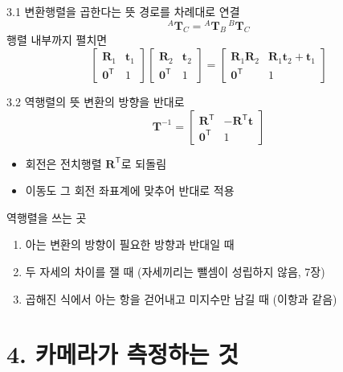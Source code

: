 \documentclass[aspectratio=169,11pt]{beamer}
\begin{document}
\begin{frame}{3.1 변환행렬을 곱한다는 뜻}
  경로를 차례대로 연결
  \[
    {}^{A}\mathbf{T}_{C}
    =
    {}^{A}\mathbf{T}_{B}\,
    {}^{B}\mathbf{T}_{C}
  \]
  \vfill
  행렬 내부까지 펼치면
  \[
    \begin{bmatrix}
      \mathbf{R}_1 & \mathbf{t}_1 \\
      \mathbf{0}^{\mathsf T} & 1
    \end{bmatrix}
    \begin{bmatrix}
      \mathbf{R}_2 & \mathbf{t}_2 \\
      \mathbf{0}^{\mathsf T} & 1
    \end{bmatrix}
    =
    \begin{bmatrix}
      \mathbf{R}_1\mathbf{R}_2 & \mathbf{R}_1\mathbf{t}_2+\mathbf{t}_1 \\
      \mathbf{0}^{\mathsf T} & 1
    \end{bmatrix}
  \]
\end{frame}

\begin{frame}{3.2 역행렬의 뜻}
  변환의 방향을 반대로
  \[
    \mathbf{T}^{-1}
    =
    \begin{bmatrix}
      \mathbf{R}^{\mathsf T} & -\mathbf{R}^{\mathsf T}\mathbf{t} \\
      \mathbf{0}^{\mathsf T} & 1
    \end{bmatrix}
  \]
  \begin{itemize}
    \item 회전은 전치행렬 $\mathbf{R}^{\mathsf T}$로 되돌림
    \item 이동도 그 회전 좌표계에 맞추어 반대로 적용
  \end{itemize}
  \vfill
  \begin{block}{역행렬을 쓰는 곳}
    \begin{enumerate}
      \item 아는 변환의 방향이 필요한 방향과 반대일 때
      \item 두 자세의 차이를 잴 때 (자세끼리는 뺄셈이 성립하지 않음, 7장)
      \item 곱해진 식에서 아는 항을 걷어내고 미지수만 남길 때 (이항과 같음)
    \end{enumerate}
  \end{block}
\end{frame}

\section{4. 카메라가 측정하는 것}
\end{document}
